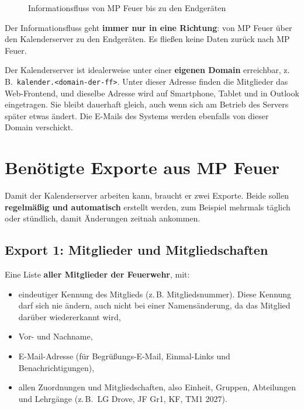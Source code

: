 \documentclass[a4paper,fontsize=10pt]{scrartcl}
\begin{document}
\begin{figure}[h]
\caption{Informationsfluss von MP Feuer bis zu den Endgeräten}
\end{figure}

Der Informationsfluss geht \textbf{immer nur in eine Richtung}: von MP Feuer
über den Kalenderserver zu den Endgeräten. Es fließen keine Daten zurück
nach MP Feuer.

Der Kalenderserver ist idealerweise unter einer \textbf{eigenen Domain}
erreichbar, z.\,B.\ \texttt{kalender.<domain-der-ff>}. Unter dieser Adresse
finden die Mitglieder das Web-Frontend, und dieselbe Adresse wird auf
Smartphone, Tablet und in Outlook eingetragen. Sie bleibt dauerhaft gleich,
auch wenn sich am Betrieb des Servers später etwas ändert. Die E-Mails des
Systems werden ebenfalls von dieser Domain verschickt.

\section{Benötigte Exporte aus MP Feuer}

Damit der Kalenderserver arbeiten kann, braucht er zwei Exporte. Beide sollen
\textbf{regelmäßig und automatisch} erstellt werden, zum Beispiel mehrmals
täglich oder stündlich, damit Änderungen zeitnah ankommen.

\subsection*{Export 1: Mitglieder und Mitgliedschaften}

Eine Liste \textbf{aller Mitglieder der Feuerwehr}, mit:
\begin{itemize}
  \item eindeutiger Kennung des Mitglieds (z.\,B. Mitgliedsnummer). Diese
        Kennung darf sich nie ändern, auch nicht bei einer Namensänderung,
        da das Mitglied darüber wiedererkannt wird,
  \item Vor- und Nachname,
  \item E-Mail-Adresse (für Begrüßungs-E-Mail, Einmal-Links und
        Benachrichtigungen),
  \item allen Zuordnungen und Mitgliedschaften, also Einheit, Gruppen,
        Abteilungen und Lehrgänge (z.\,B.\ LG Drove, JF Gr1, KF, TM1 2027).
\end{itemize}
\end{document}
